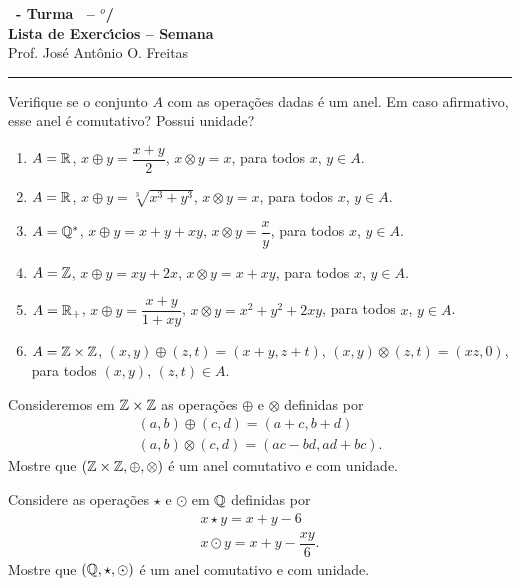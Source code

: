 \documentclass[12pt]{exam}
\begin{document}
    \begin{center}
    {\Large\bf \disciplina\ - Turma \turma\ -- \semestre$^{o}$/\ano} \\ \vspace{9pt} {\large\bf
        Lista de Exerc{\'\i}cios -- Semana \numerosemana}\\ \vspace{9pt} Prof. Jos{\'e} Ant{\^o}nio O. Freitas
    \end{center}
    \hrule

    \vspace{.6cm}

    \questao{} Verifique se o conjunto $A$ com as opera\c{c}\~oes dadas \'e um anel. Em caso afirmativo, esse anel \'e comutativo? Possui unidade?
    \begin{enumerate}[label={\alph*})]
        \item $A = \mathbb{R}$, $x \oplus y = \dfrac{x + y}{2}$, $x \otimes y = x$, para todos $x$, $y \in A$.
        \item $A = \mathbb{R}$, $x \oplus y = \sqrt[3]{x^3 + y^3}$, $x \otimes y = x$, para todos $x$, $y \in A$.
        \item $A = \mathbb{Q}^*$, $x \oplus y = x + y + xy$, $x \otimes y = \dfrac{x}{y}$, para todos $x$, $y \in A$.
        \item $A = \mathbb{Z}$, $x \oplus y = xy + 2x$, $x \otimes y = x + xy$, para todos $x$, $y \in A$.
        \item $A = \mathbb{R}_+$, $x \oplus y = \dfrac{x + y}{1 + xy}$, $x \otimes y = x^2 + y^2 + 2xy$, para todos $x$, $y \in A$.
        \item $A = \mathbb{Z} \times \mathbb{Z}$, $(x, y) \oplus (z, t) = (x + y, z + t)$, $(x, y) \otimes (z, t) = (xz, 0)$, para todos $(x, y)$, $(z, t) \in A$.
    \end{enumerate}

    \vspace{.4cm}

    \questao{} Consideremos em $\mathbb{Z} \times \mathbb{Z}$ as opera\c{c}\~oes $\oplus$ e $\otimes$ definidas por
    \begin{align*}
        (a, b) \oplus (c, d) = (a + c, b + d)\\
        (a ,b) \otimes (c, d) = (ac - bd, ad + bc).
    \end{align*}
    Mostre que $(\mathbb{Z} \times \mathbb{Z}, \oplus, \otimes)$ \'e um anel comutativo e com unidade.

    \vspace{.4cm}

    \questao{} Considere as opera\c{c}\~oes $\star$ e $\odot$ em $\mathbb{Q}$ definidas por
    \begin{align*}
        x \star y = x + y - 6\\
        x \odot y = x + y - \dfrac{xy}{6}.
    \end{align*}
    Mostre que $(\mathbb{Q}, \star, \odot)$ \'e um anel comutativo e com unidade.
\end{document}

